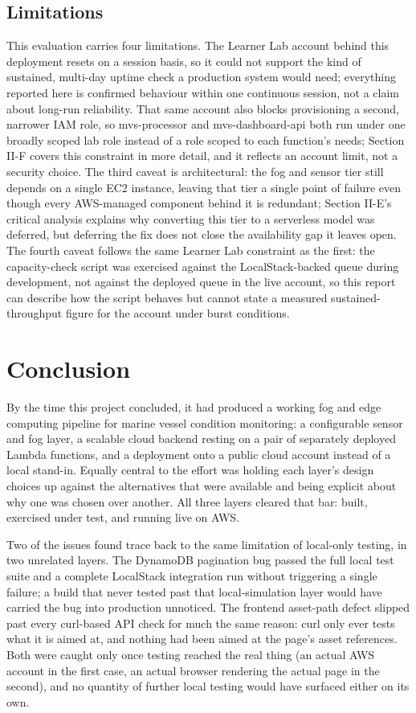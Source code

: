 \documentclass[conference]{IEEEtran}
\begin{document}
\subsection{Limitations}
This evaluation carries four limitations. The Learner Lab account behind this deployment resets on a session basis, so it could not support the kind of sustained, multi-day uptime check a production system would need; everything reported here is confirmed behaviour within one continuous session, not a claim about long-run reliability. That same account also blocks provisioning a second, narrower IAM role, so mvs-processor and mvs-dashboard-api both run under one broadly scoped lab role instead of a role scoped to each function's needs; Section II-F covers this constraint in more detail, and it reflects an account limit, not a security choice. The third caveat is architectural: the fog and sensor tier still depends on a single EC2 instance, leaving that tier a single point of failure even though every AWS-managed component behind it is redundant; Section II-E's critical analysis explains why converting this tier to a serverless model was deferred, but deferring the fix does not close the availability gap it leaves open. The fourth caveat follows the same Learner Lab constraint as the first: the capacity-check script was exercised against the LocalStack-backed queue during development, not against the deployed queue in the live account, so this report can describe how the script behaves but cannot state a measured sustained-throughput figure for the account under burst conditions.

\section{Conclusion}
By the time this project concluded, it had produced a working fog and edge computing pipeline for marine vessel condition monitoring: a configurable sensor and fog layer, a scalable cloud backend resting on a pair of separately deployed Lambda functions, and a deployment onto a public cloud account instead of a local stand-in. Equally central to the effort was holding each layer's design choices up against the alternatives that were available and being explicit about why one was chosen over another. All three layers cleared that bar: built, exercised under test, and running live on AWS.

Two of the issues found trace back to the same limitation of local-only testing, in two unrelated layers. The DynamoDB pagination bug passed the full local test suite and a complete LocalStack integration run without triggering a single failure; a build that never tested past that local-simulation layer would have carried the bug into production unnoticed. The frontend asset-path defect slipped past every curl-based API check for much the same reason: curl only ever tests what it is aimed at, and nothing had been aimed at the page's asset references. Both were caught only once testing reached the real thing (an actual AWS account in the first case, an actual browser rendering the actual page in the second), and no quantity of further local testing would have surfaced either on its own.
\end{document}
